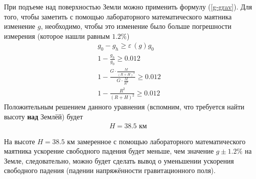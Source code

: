 \documentclass[a4paper,12pt]{article}
\begin{document}
		При подъеме над поверхностью Земли можно применить формулу (\ref{g-grav}). Для того, чтобы заметить с помощью лабораторного математического маятника изменение $g$, необходимо, чтобы это изменение было больше погрешности измерения (которое нашли равным $1.2\%$)
		\begin{eqnarray*}
			g_0-g_h\ge\varepsilon\,(g)g_0\\
			1-\frac{g_h}{g_0}\ge0.012\\
			1-\frac{G\cdot\frac{M}{(R+H)^2}}{G\cdot\frac{M}{R^2}}\ge0.012\\
			1-\frac{R^2}{(R+H)^2}\ge0.012
		\end{eqnarray*}
		Положительным решением данного уравнения (вспомним, что требуется найти высоту \textbf{над} Землёй) будет
		\begin{eqnarray*}
			H=38.5\text{ км }
		\end{eqnarray*}

		На высоте $H=38.5$ км замеренное с помощью лабораторного математического маятника ускорение свободного падения будет меньше, чем значение ${g} \pm 1.2\%$ на Земле, следовательно, можно будет сделать вывод о уменьшении ускорения свободного падения (падении напряжённости гравитационного поля).
\end{document}
